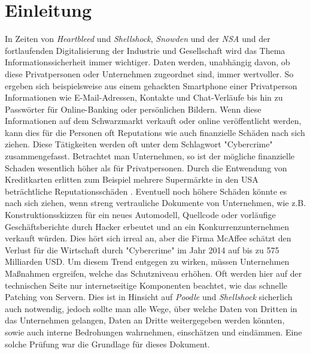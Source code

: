 \chapter{Einleitung}
In Zeiten von \textit{Heartbleed}\cite{Heartbleed} und  \textit{Shellshock}\cite{Shellshock}, \textit{Snowden} und der \textit{NSA}\cite{Snowden} und der fortlaufenden Digitalisierung der Industrie und Gesellschaft wird das Thema Informationssicherheit immer wichtiger. Daten werden, unabhängig davon, ob diese Privatpersonen oder Unternehmen zugeordnet sind, immer wertvoller. So ergeben sich beispielsweise aus einem gehackten Smartphone einer Privatperson Informationen wie E-Mail-Adressen, Kontakte und Chat-Verläufe bis hin zu Passwörter für Online-Banking oder persönlichen Bildern. Wenn diese Informationen auf dem Schwarzmarkt verkauft oder online veröffentlicht werden, kann dies für die Personen oft Reputations wie auch finanzielle Schäden nach sich ziehen. Diese Tätigkeiten werden oft unter dem Schlagwort "Cybercrime" zusammengefasst. Betrachtet man Unternehmen, so ist der mögliche finanzielle Schaden wesentlich höher als für Privatpersonen. Durch die Entwendung von Kreditkarten erlitten zum Beispiel mehrere Supermärkte in den USA beträchtliche Reputationsschäden \cite{HackKreditkarten}\cite{HackKreditkarten2}. Eventuell noch höhere Schäden könnte es nach sich ziehen, wenn streng vertrauliche Dokumente von Unternehmen, wie z.B. Konstruktionsskizzen für ein neues Automodell, Quellcode oder vorläufige Geschäftsberichte durch Hacker erbeutet und an ein Konkurrenzunternehmen verkauft würden. Dies hört sich irreal an, aber die Firma McAffee schätzt den Verlust für die Wirtschaft durch "Cybercrime" im Jahr 2014 auf bis zu 575 Milliarden USD\cite{McAffee}. 
Um diesem Trend entgegen zu wirken, müssen Unternehmen Maßnahmen ergreifen, welche das Schutzniveau erhöhen. Oft werden hier auf der technischen Seite nur internetseitige Komponenten beachtet, wie das schnelle Patching von Servern. Dies ist in Hinsicht auf  \textit{Poodle}\cite{Poodle} und \textit{Shellshock}\cite{Shellshock} sicherlich auch notwendig, jedoch sollte man alle Wege, über welche Daten von Dritten in das Unternehmen gelangen, Daten an Dritte weitergegeben werden könnten, sowie auch interne Bedrohungen wahrnehmen, einschätzen und eindämmen. Eine solche Prüfung war die Grundlage für dieses Dokument.